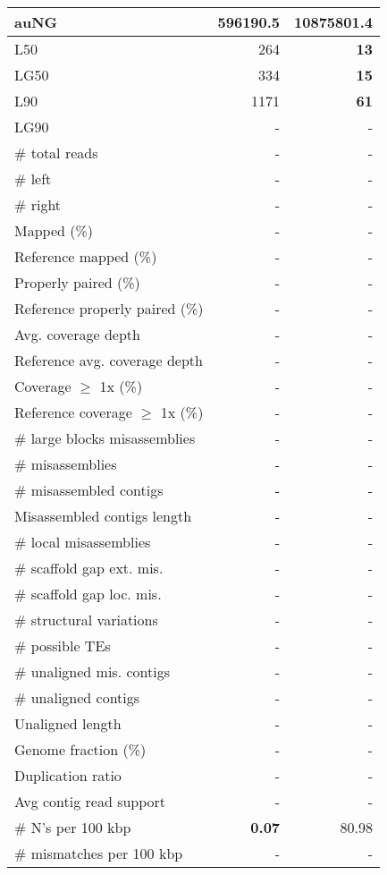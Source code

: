 \documentclass[12pt,a4paper]{article}
\begin{document}
\begin{table}[ht]
\begin{center}
\begin{tabular}{|l*{2}{|r}|}
auNG & 596190.5 & {\bf 10875801.4} \\ \hline
L50 & 264 & {\bf 13} \\ \hline
LG50 & 334 & {\bf 15} \\ \hline
L90 & 1171 & {\bf 61} \\ \hline
LG90 & - & - \\ \hline
\# total reads & - & - \\ \hline
\# left & - & - \\ \hline
\# right & - & - \\ \hline
Mapped (\%) & - & - \\ \hline
Reference mapped (\%) & - & - \\ \hline
Properly paired (\%) & - & - \\ \hline
Reference properly paired (\%) & - & - \\ \hline
Avg. coverage depth & - & - \\ \hline
Reference avg. coverage depth & - & - \\ \hline
Coverage $\geq$ 1x (\%) & - & - \\ \hline
Reference coverage $\geq$ 1x (\%) & - & - \\ \hline
\# large blocks misassemblies & - & - \\ \hline
\# misassemblies & - & - \\ \hline
\# misassembled contigs & - & - \\ \hline
Misassembled contigs length & - & - \\ \hline
\# local misassemblies & - & - \\ \hline
\# scaffold gap ext. mis. & - & - \\ \hline
\# scaffold gap loc. mis. & - & - \\ \hline
\# structural variations & - & - \\ \hline
\# possible TEs & - & - \\ \hline
\# unaligned mis. contigs & - & - \\ \hline
\# unaligned contigs & - & - \\ \hline
Unaligned length & - & - \\ \hline
Genome fraction (\%) & - & - \\ \hline
Duplication ratio & - & - \\ \hline
Avg contig read support & - & - \\ \hline
\# N's per 100 kbp & {\bf 0.07} & 80.98 \\ \hline
\# mismatches per 100 kbp & - & - \\ \hline

\end{tabular}
\end{center}
\end{table}
\end{document}
